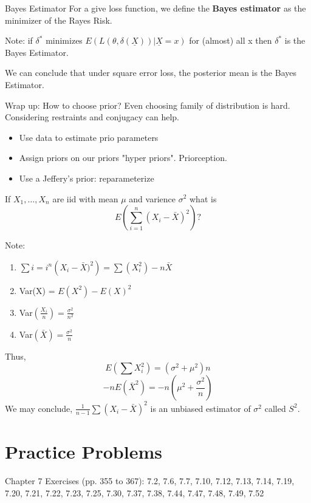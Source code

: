 \documentclass[11pt,fleqn]{book} %
\begin{document}
	\begin{definition}{Bayes Estimator}
		For a give loss function, we define the \textbf{Bayes estimator} as the minimizer of the Rayes Risk. 
	\end{definition}
	Note: if $\delta^*$ minimizes $E(L(\theta,\delta(\underline{X}))|\underline{X}=x)$ for (almost) all x then $\delta^*$ is the Bayes Estimator. 

	We can conclude that under square error loss, the posterior mean is the Bayes Estimator. 

	Wrap up: How to choose prior? Even choosing family of distribution is hard. Considering restraints and conjugacy can help.
	\begin{itemize}
		\item Use data to estimate prio parameters
		\item Assign priors on our priors "hyper priors". Priorception.
		\item Use a Jeffery's prior: reparameterize
	\end{itemize}

	\begin{exercise}
	If $X_1, \dots, X_n$ are iid with mean $\mu$ and varience $\sigma^2$ what is
	$$
	E \left(\sum_{i=1}^n (X_i-\bar{X})^2 \right)?
	$$

	Note:
	\begin{enumerate}
			\item $\sum{i=i}^n \left (X_i - \bar{X})^2 \right) = \sum (X_i^2) - n\bar{X}$
			\item Var(X) = $E(X^2)-E(X)^2$
			\item Var$(\frac{X_i}{n})=\frac{\sigma^2}{n^2}$
			\item Var$(\bar{X})=\frac{\sigma^2}{n}$
		\end{enumerate}	

	Thus,
	$$E (\sum X_i^2) = (\sigma^2 + \mu^2)n$$
	$$-n E(\bar{X}^2)= -n(\mu^2+\frac{\sigma^2}{n}) $$
	We may conclude, $\frac{1}{n-1}\sum(X_i-\bar{X})^2$ is an unbiased estimator of $\sigma^2$ called $S^2$. 
	\end{exercise}

	


\section{Practice Problems}

Chapter 7 Exercises (pp. 355 to 367): 7.2, 7.6, 7.7, 7.10, 7.12, 7.13, 7.14, 7.19, 7.20, 7.21, 7.22, 7.23, 7.25, 7.30, 7.37, 7.38, 7.44, 7.47, 7.48, 7.49, 7.52\\
\\
\end{document}
